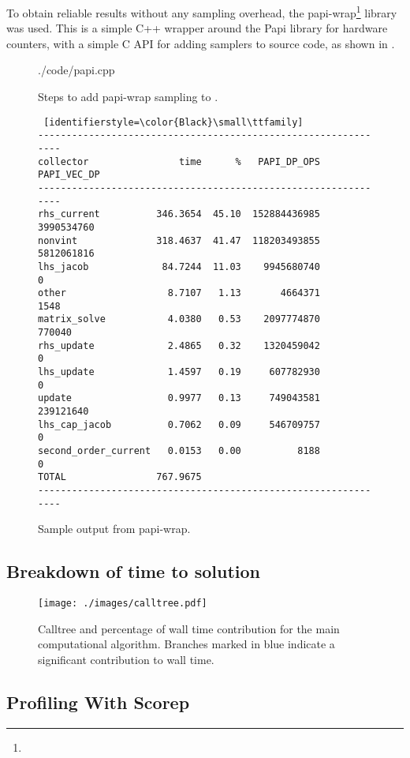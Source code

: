 To obtain reliable results without any sampling overhead, the papi-wrap\footnote{} library was used. This is a simple C++ wrapper around the Papi library for hardware counters, with a simple C API for adding samplers to source code, as shown in .

\begin{figure}[htp!]
\begin{shaded}
 {./code/papi.cpp}
\end{shaded}
\caption{Steps to add papi-wrap sampling to \neuron.}
\label{fig:papiinline}
\end{figure}

\begin{figure}[htp!]
\begin{lstlisting} [identifierstyle=\color{Black}\small\ttfamily]
---------------------------------------------------------------
collector                time      %   PAPI_DP_OPS PAPI_VEC_DP
---------------------------------------------------------------
rhs_current          346.3654  45.10  152884436985  3990534760
nonvint              318.4637  41.47  118203493855  5812061816
lhs_jacob             84.7244  11.03    9945680740           0
other                  8.7107   1.13       4664371        1548
matrix_solve           4.0380   0.53    2097774870      770040
rhs_update             2.4865   0.32    1320459042           0
lhs_update             1.4597   0.19     607782930           0
update                 0.9977   0.13     749043581   239121640
lhs_cap_jacob          0.7062   0.09     546709757           0
second_order_current   0.0153   0.00          8188           0
TOTAL                767.9675
---------------------------------------------------------------
\end{lstlisting}
\caption{Sample output from papi-wrap.}
\label{fig:papisample}
\end{figure}

\subsection{Breakdown of time to solution}
\begin{figure}[htp!]
\centering
\texttt{[image: ./images/calltree.pdf]}
\caption{Calltree and percentage of wall time contribution for the main computational algorithm. Branches marked in blue indicate a significant contribution to wall time.}
\label{fig:calltree}
\end{figure}


\subsection{Profiling With Scorep}
\label{sec:scorep}

